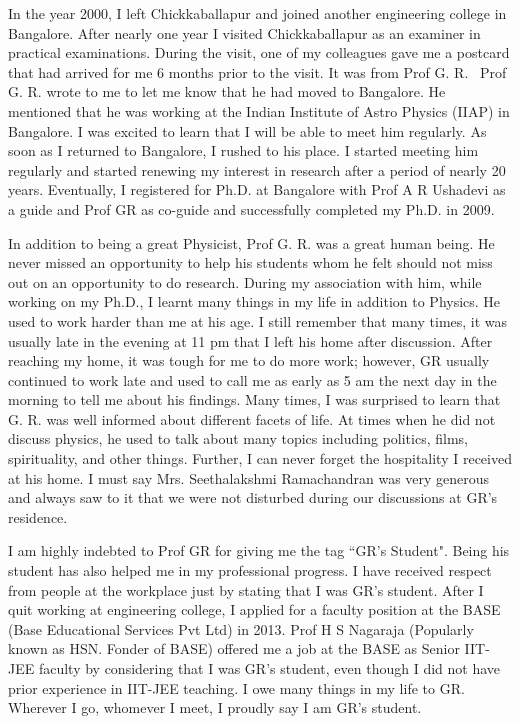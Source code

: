In the year 2000, I left Chickkaballapur and joined another engineering college in Bangalore. After nearly one year I visited Chickkaballapur as an examiner in practical examinations. During the visit, one of my colleagues gave me a postcard that had arrived for me 6 months prior to the visit. It was from Prof G. R.  Prof G. R. wrote to me to let me know that he had moved to Bangalore. He mentioned that he was working at the Indian Institute of Astro Physics (IIAP) in Bangalore. I was excited to learn that I will be able to meet him regularly. As soon as I returned to Bangalore, I rushed to his place. I started meeting him regularly and started renewing my interest in research after a period of nearly 20 years. Eventually, I registered for Ph.D. at Bangalore with Prof A R Ushadevi as a guide and Prof GR as co-guide and successfully completed my Ph.D. in 2009. 

In addition to being a great Physicist, Prof G. R. was a great human being. He never missed an opportunity to help his students whom he felt should not miss out on an opportunity to do research. During my association with him, while working on my Ph.D., I learnt many things in my life in addition to Physics. He used to work harder than me at his age. I still remember that many times, it was usually late in the evening at 11 pm that I left his home after discussion. After reaching my home, it was tough for me to do more work; however, GR usually continued to work late and used to call me as early as 5 am the next day in the morning to tell me about his findings. Many times, I was surprised to learn that G. R. was well informed about different facets of life. At times when he did not discuss physics, he used to talk about many topics including politics, films, spirituality, and other things. Further, I can never forget the hospitality I received at his home. I must say Mrs. Seethalakshmi Ramachandran was very generous and always saw to it that we were not disturbed during our discussions at GR's residence.

\eject

I am highly indebted to Prof GR for giving me the tag ``GR's Student". Being his student has also helped me in my professional progress. I have received respect from people at the workplace just by stating that I was GR's student. After I quit working at engineering college, I applied for a faculty position at the BASE (Base Educational Services Pvt Ltd) in 2013. Prof H S Nagaraja (Popularly known as HSN. Fonder of BASE) offered me a job at the BASE as Senior IIT-JEE faculty by considering that I was GR's student, even though I did not have prior experience in IIT-JEE teaching. I owe many things in my life to GR. Wherever I go, whomever I meet, I proudly say I am GR's student. 

